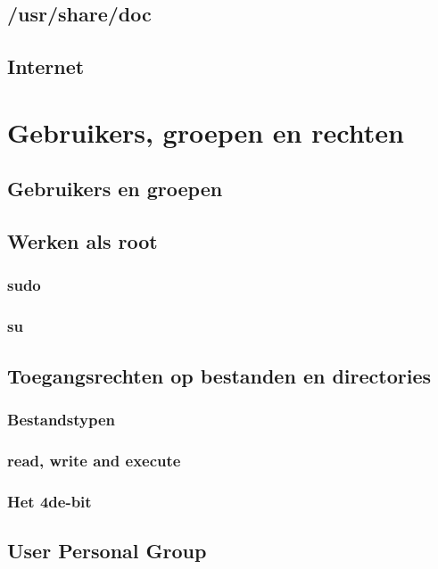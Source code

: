 \documentclass[a4paper,12pt,twoside,openright,titlepage]{book}
\begin{document}
\section{/usr/share/doc}

\section{Internet}


\chapter{Gebruikers, groepen en rechten}

\section{Gebruikers en groepen}


\section{Werken als root}

\subsection{sudo}

\subsection{su}

\section{Toegangsrechten op bestanden en directories}
\subsection{Bestandstypen}
\subsection{read, write and execute}
\subsection{Het 4de-bit}
\section{User Personal Group}
\end{document}
